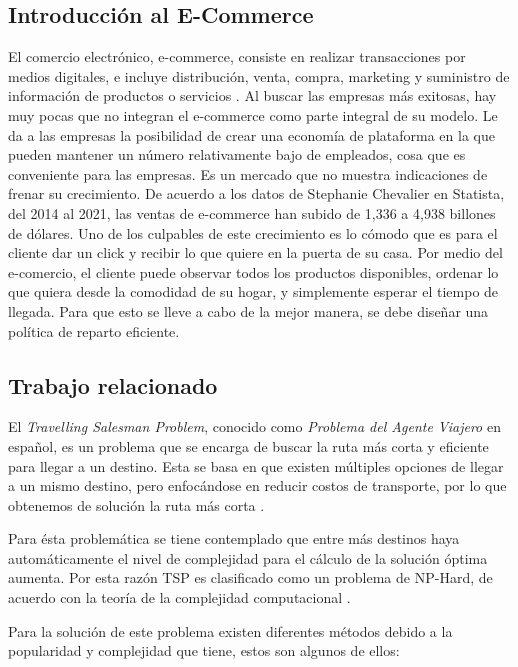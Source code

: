 \documentclass[journal]{IEEEtran}                                                          %
\begin{document}
        \subsection{Introducción al E-Commerce}
        
            El comercio electrónico, e-commerce, consiste en realizar transacciones por medios digitales, e incluye distribución, venta, compra, marketing y suministro de información de productos o servicios \cite{visand}. Al buscar las empresas más exitosas, hay muy pocas que no integran el e-commerce como parte integral de su modelo. Le da a las empresas la posibilidad de crear una economía de plataforma \cite{dekker-supremacy} en la que pueden mantener un número relativamente bajo de empleados, cosa que es conveniente para las empresas. Es un mercado que no muestra indicaciones de frenar su crecimiento. De acuerdo a los datos de Stephanie Chevalier en Statista, del 2014 al 2021, las ventas de e-commerce han subido de 1,336 a 4,938 billones de dólares. Uno de los culpables de este crecimiento es lo cómodo que es para el cliente dar un click y recibir lo que quiere en la puerta de su casa. Por medio del e-comercio, el cliente puede observar todos los productos disponibles, ordenar lo que quiera desde la comodidad de su hogar, y simplemente esperar el tiempo de llegada. Para que esto se lleve a cabo de la mejor manera, se debe diseñar una política de reparto eficiente.
    
        \subsection{Trabajo relacionado}
        
            El \emph{Travelling Salesman Problem}, conocido como \emph{Problema del Agente Viajero} en español, es un problema que se encarga de buscar la ruta más corta y eficiente para llegar a un destino. Esta se basa en que existen múltiples opciones de llegar a un mismo destino, pero enfocándose en reducir costos de transporte, por lo que obtenemos de solución la ruta más corta \cite{trevelingProb}.
    
            Para ésta problemática se tiene contemplado que entre más destinos haya automáticamente el nivel de complejidad para el cálculo de la solución óptima aumenta. Por esta razón TSP es clasificado como un problema de NP-Hard, de acuerdo con la teoría de la complejidad computacional \cite{trevelingProb}.
    
            Para la solución de este problema existen diferentes métodos debido a la popularidad y complejidad que tiene, estos son algunos de ellos:
            
\end{document}
